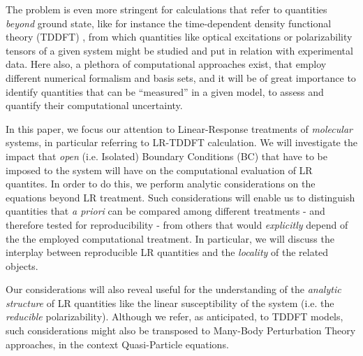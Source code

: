 \documentclass[reprint,aps,prb]{revtex4-1}
\begin{document}
The problem is even more stringent for calculations that refer to quantities \emph{beyond} ground state, like
for instance the time-dependent density functional theory (TDDFT) \cite{casida1995,runge1984,onida2002},
from which quantities like optical excitations or polarizability tensors
of a given system might be studied and put in relation with experimental data.
Here also, a plethora of computational approaches exist, that employ different numerical formalism and
basis sets, and it will be of great importance to identify quantities that can be ``measured'' in a given model, to assess
and quantify their computational uncertainty.

In this paper, we focus our attention to Linear-Response treatments of \emph{molecular} systems, 
in particular referring to LR-TDDFT calculation. We will investigate the impact that 
\emph{open} (i.e. Isolated) Boundary Conditions (BC) that have to be imposed to the system will have on the computational evaluation of LR quantites.
In order to do this, we perform analytic considerations on the equations beyond LR treatment.
Such considerations will enable us to distinguish quantities that \textit{a priori} can be compared among different treatments - and therefore tested for reproducibility - 
from others that would \emph{explicitly} depend of the the employed computational treatment. 
In particular, we will discuss the interplay between reproducible LR quantities and the \emph{locality} of the related objects.

Our considerations will also reveal useful for the understanding of the \emph{analytic structure} of LR quantities like
the linear susceptibility of the system (i.e. the \emph{reducible} polarizability).
Although we refer, as anticipated, to TDDFT models, such considerations might also be transposed to Many-Body Perturbation Theory
approaches, in the context Quasi-Particle equations.

\end{document}
